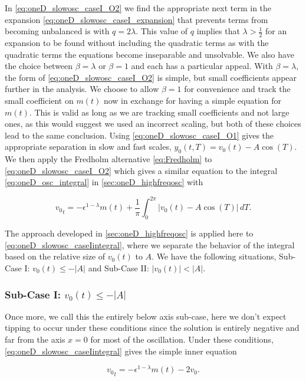 In \eqref{eq:oneD_slowosc_caseI_O2} we find the appropriate next term in the expansion \eqref{eq:oneD_slowosc_caseI_expansion} that prevents terms from becoming unbalanced is with $q= 2\lambda$. This value of $q$ implies that $\lambda> \frac{1}{2}$ for an expansion to be found without including the quadratic terms as with the quadratic terms the equations become inseparable and unsolvable. We also have the choice between $\beta=\lambda$ or $\beta=1$ and each has a particular appeal. With $\beta=\lambda$, the form of \eqref{eq:oneD_slowosc_caseI_O2} is simple, but small coefficients appear further in the analysis. We choose to allow $\beta=1$ for convenience and track the small coefficient on $m(t)$ now in exchange for having a simple equation for $m(t)$. This is valid as long as we are tracking small coefficients and not large ones, as this would suggest we used an incorrect scaling, but both of these choices lead to the same conclusion. Using \eqref{eq:oneD_slowosc_caseI_O1} gives the appropriate separation in slow and fast scales, $y_0(t,T)=v_0(t)-A\cos(T)$. We then apply the Fredholm alternative \eqref{eq:Fredholm} to \eqref{eq:oneD_slowosc_caseI_O2} which gives a similar equation to the integral \eqref{eq:oneD_osc_integral} in \autoref{sec:oneD_highfreqosc} with

\begin{equation}\label{eq:oneD_slowosc_caseIintegral}
{v_0}_t = -\epsilon^{1-\lambda}m(t)+\frac{1}{\pi}\int_0^{2\pi} |v_0(t)-A\cos(T)|\,dT.
\end{equation}

The approach developed in \autoref{sec:oneD_highfreqosc} is applied here to \eqref{eq:oneD_slowosc_caseIintegral}, where we separate the behavior of the integral based on the relative size of $v_0(t)$ to $A$. We have the following situations, Sub-Case I: $v_0(t)\le -|A|$ and Sub-Case II: $|v_0(t)|<|A|$.

\subsubsection{Sub-Case I: $v_0(t) \le -|A|$} 
\label{subsubsec:oneD_slowosc_subcaseI}

Once more, we call this the entirely below axis sub-case, here we don't expect tipping to occur under these conditions since the solution is entirely negative and far from the axis $x=0$ for most of the oscillation. Under these conditions, \eqref{eq:oneD_slowosc_caseIintegral} gives the simple inner equation

\begin{equation}\label{eq:oneD_slowosc_innersubcaseI}
{v_0}_t= -\epsilon^{1-\lambda}m(t)-2v_0.
\end{equation}

